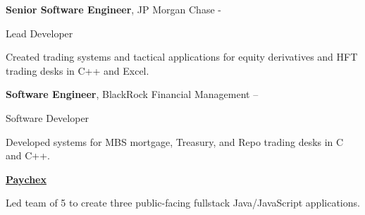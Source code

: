 \documentclass[MMMMyyyy,nonstopmode]{simpleresumecv_stacked}
\newif\ifLOCATION
\begin{document}
\begin{Body}
\begin{Detail}
\end{Detail}

\Gap
\Entry
\textbf{Senior Software Engineer}, JP Morgan Chase
\hfill 
 - 

Lead Developer
\ifLOCATION
\hfill
New York, New York
\fi

\begin{Detail}
Created trading systems and tactical applications for equity derivatives and HFT trading desks in C++ and Excel.

\end{Detail}

\Entry
\textbf{Software Engineer}, BlackRock Financial Management
\hfill 
 --  

Software Developer
\ifLOCATION
\hfill
New York, New York
\fi

\begin{Detail}
Developed systems for MBS mortgage, Treasury, and Repo trading desks in C and C++.
\end{Detail}

\else

\iffalse %
\BigGap
\Entry
\href{http://www.paychex.com/}
{\textbf{Paychex}}

\begin{Detail}
	Led team of 5 to create three public-facing fullstack Java/JavaScript applications.


\end{Detail}
\end{Body}
\end{document}

